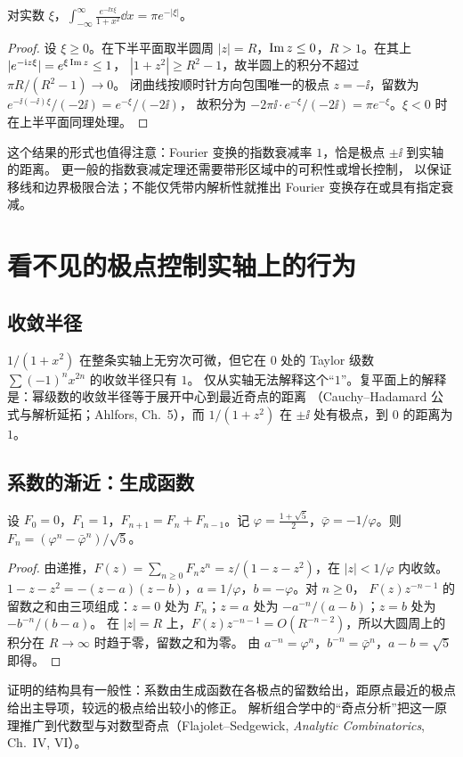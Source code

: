 \documentclass[11pt]{article}
\begin{document}
\begin{proposition}\label{prop:fourier}
对实数 $\xi$，$\displaystyle\int_{-\infty}^{\infty}\frac{e^{-\ii x\xi}}{1+x^2}\dd x=\pi e^{-|\xi|}$。
\end{proposition}
\begin{proof}
设 $\xi\ge0$。在下半平面取半圆周 $|z|=R$，$\operatorname{Im} z\le0$，$R>1$。在其上 $|e^{-\mathrm i z\xi}|=e^{\xi\operatorname{Im} z}\le1$，
$|1+z^2|\ge R^2-1$，故半圆上的积分不超过 $\pi R/(R^2-1)\to0$。
闭曲线按顺时针方向包围唯一的极点 $z=-\ii$，留数为 $e^{-\ii(-\ii)\xi}/(-2\ii)=e^{-\xi}/(-2\ii)$，
故积分为 $-2\pi\ii\cdot e^{-\xi}/(-2\ii)=\pi e^{-\xi}$。$\xi<0$ 时在上半平面同理处理。
\end{proof}
这个结果的形式也值得注意：Fourier 变换的指数衰减率 $1$，恰是极点 $\pm\ii$ 到实轴的距离。
更一般的指数衰减定理还需要带形区域中的可积性或增长控制，
以保证移线和边界极限合法；不能仅凭带内解析性就推出 Fourier 变换存在或具有指定衰减。

\section{看不见的极点控制实轴上的行为}
\subsection{收敛半径}
$1/(1+x^2)$ 在整条实轴上无穷次可微，但它在 $0$ 处的 Taylor 级数 $\sum(-1)^nx^{2n}$ 的收敛半径只有 $1$。
仅从实轴无法解释这个“$1$”。复平面上的解释是：幂级数的收敛半径等于展开中心到最近奇点的距离
（Cauchy--Hadamard 公式与解析延拓；Ahlfors, Ch.~5），而 $1/(1+z^2)$ 在 $\pm\ii$ 处有极点，到 $0$ 的距离为 $1$。

\subsection{系数的渐近：生成函数}
\begin{proposition}\label{prop:fib}
设 $F_0=0$，$F_1=1$，$F_{n+1}=F_n+F_{n-1}$。记 $\varphi=\frac{1+\sqrt5}2$，$\bar\varphi=-1/\varphi$。则
$F_n=(\varphi^n-\bar\varphi^n)/\sqrt5$。
\end{proposition}
\begin{proof}
由递推，$F(z)=\sum_{n\ge0}F_nz^n=z/(1-z-z^2)$，在 $|z|<1/\varphi$ 内收敛。
$1-z-z^2=-(z-a)(z-b)$，$a=1/\varphi$，$b=-\varphi$。对 $n\ge0$，
$F(z)z^{-n-1}$ 的留数之和由三项组成：$z=0$ 处为 $F_n$；$z=a$ 处为 $-a^{-n}/(a-b)$；$z=b$ 处为 $-b^{-n}/(b-a)$。
在 $|z|=R$ 上，$F(z)z^{-n-1}=O(R^{-n-2})$，所以大圆周上的积分在 $R\to\infty$ 时趋于零，留数之和为零。
由 $a^{-n}=\varphi^n$，$b^{-n}=\bar\varphi^n$，$a-b=\sqrt5$ 即得。
\end{proof}
证明的结构具有一般性：系数由生成函数在各极点的留数给出，距原点最近的极点给出主导项，较远的极点给出较小的修正。
解析组合学中的“奇点分析”把这一原理推广到代数型与对数型奇点（Flajolet--Sedgewick, \emph{Analytic Combinatorics}, Ch.~IV, VI）。
\end{document}
